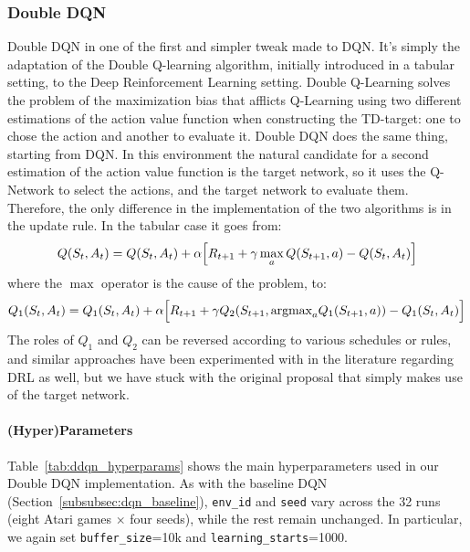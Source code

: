 \subsubsection{Double DQN}
\label{subsubsec:double_dqn}
Double DQN in one of the first and simpler tweak made to DQN. It's simply the adaptation of the Double Q-learning algorithm, initially introduced in a tabular setting, to the Deep Reinforcement Learning setting. Double Q-Learning solves the problem of the maximization bias that afflicts Q-Learning using two different estimations of the action value function when constructing the TD-target: one to chose the action and another to evaluate it. Double DQN does the same thing, starting from DQN. In this environment the natural candidate for a second estimation of the action value function is the target network, so it uses the Q-Network to select the actions, and the target network to evaluate them. Therefore, the only difference in the implementation of the two algorithms is in the update rule. In the tabular case it goes from:
$$Q(S_t, A_t) = Q(S_t, A_t) + \alpha \Bigl[ R_{t+1} + \gamma\max_{a} Q(S_{t+1}, a) - Q(S_t, A_t) \Bigr]$$
where the $\max$ operator is the cause of the problem, to:
$$Q_1(S_t, A_t) = Q_1(S_t, A_t) + \alpha \Bigl[ R_{t+1} + \gamma Q_2(S_{t+1}, \text{argmax}_a Q_1(S_{t+1}, a)) - Q_1(S_t, A_t) \Bigr]$$
The roles of $Q_1$ and $Q_2$ can be reversed according to various schedules or rules, and similar approaches have been experimented with in the literature regarding DRL as well, but we have stuck with the original proposal that simply makes use of the target network.

\paragraph{(Hyper)Parameters}
Table~\ref{tab:ddqn_hyperparams} shows the main hyperparameters used in our Double DQN implementation.  
As with the baseline DQN (Section~\ref{subsubsec:dqn_baseline}), \texttt{env\_id} and \texttt{seed} vary across the 32 runs (eight Atari games $\times$ four seeds), while the rest remain unchanged. In particular, we again set \texttt{buffer\_size}=10k and \texttt{learning\_starts}=1000. 

